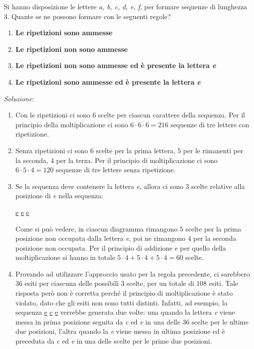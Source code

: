 \begin{ese}
	Si hanno disposizione le lettere \emph{a, b, c, d, e, f}, per formare sequenze di lunghezza 3.
	Quante se ne possono formare con le seguenti regole?
	\begin{enumerate}
		\item \textbf{Le ripetizioni sono ammesse}
		\item \textbf{Le ripetizioni non sono ammesse}
		\item \textbf{Le ripetizioni non sono ammesse ed è presente la lettera \emph{e}}
		\item \textbf{Le ripetizioni sono ammesse ed è presente la lettera \emph{e}}
	\end{enumerate}
	\emph{Soluzione}:
	\begin{enumerate}
		\item Con le ripetizioni ci sono $6$ scelte per ciascun carattere della sequenza. 
		Per il principio della moltiplicazione ci sono $6 \cdot 6 \cdot  6 = 216$ sequenze di
		tre lettere con ripetizione.
		\item Senza ripetizioni ci sono $6$ scelte per la prima lettera, $5$ per le rimanenti
		per la seconda, $4$ per la terza. Per il principio di moltiplicazione ci sono 
		$6 \cdot 5 \cdot 4 = 120$ sequenze di tre lettere senza ripetizione.
		\item Se la sequenza deve contenere la lettera \emph{e}, allora ci sono 3 scelte relative
		alla posizione di \emph{e} nella sequenza:
		\begin{center}
			\centering
			\underline{e} \underline{ } \underline{ }
			\quad
			\underline{ } \underline{e} \underline{ }
			\quad
			\underline{ } \underline{ } \underline{e}
		\end{center}
		Come si può vedere, in ciascun diagramma rimangono $5$ scelte per la prima posizione non
		occupata dalla lettera \emph{e}, poi ne rimangono $4$ per la seconda posizione non occupata.
		Per il principio di addizione e per quello della moltiplicazione si hanno in totale 
		$ 5 \cdot 4 +  5 \cdot 4 +  5 \cdot 4 = 60$ scelte.
		\item Provando ad utilizzare l'approccio usato per la regola precedente, ci sarebbero $36$
		esiti per ciascuna delle possibili 3 scelte, per un totale di $108$ esiti.
		Tale risposta però non è corretta perché il principio di moltiplicazione è stato violato, dato
		che gli esiti non sono tutti distinti. Infatti, ad esempio, la sequenza
		\underline{e} \underline{c} \underline{e} verrebbe generata due volte: una quando 
		la lettera \emph{e} viene messa in prima posizione seguita da \emph{c} ed \emph{e} in
		una delle 36 scelte per le ultime due posizioni, l'altra quando la \emph{e} viene messa
		in ultima posizione ed è preceduta da \emph{c} ed \emph{e} in una delle scelte per le
		prime due posizioni.
		

\end{enumerate}
\end{ese}
